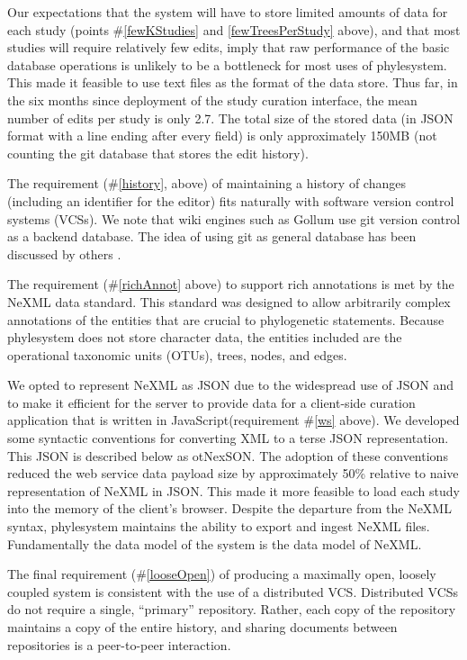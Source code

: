 \documentclass{bioinfo}
\newcommand{\ps}{phylesystem\xspace}
\newcommand{\nexson}{otNexSON\xspace}
\newcommand{\js}{JavaScript\xspace}
\begin{document}
Our expectations that the system will have to store limited amounts of data for each study 
    (points \#\ref{fewKStudies} and \ref{fewTreesPerStudy} above), and that most
    studies will require relatively few edits, imply that
    raw performance of the basic database operations is unlikely to be a bottleneck for most
    uses of \ps.
This made it feasible to use text files as the format of the data store.
Thus far, in the six months since deployment of the study curation interface, the mean number of edits 
    per study is only 2.7.
The total size of the stored data (in JSON format with a line ending after 
    every field) is only approximately 150MB (not counting the git database that stores the edit history).

The requirement (\#\ref{history}, above) of maintaining a history of changes 
    (including an identifier for the editor) fits naturally with software version control systems (VCSs).
We note that wiki engines such as Gollum use git version control as a backend database.
The idea of using git as general database has been discussed by others \citep{git-nosql-db}.

The requirement (\#\ref{richAnnot} above) to support rich annotations
    is met by the NeXML data standard.
    This standard was designed
    to allow arbitrarily complex annotations of the entities that are crucial to phylogenetic statements.
Because \ps does not store character data, the entities included are the operational taxonomic units (OTUs), trees, nodes, and edges.

We opted to represent NeXML as JSON
    due to the widespread use of JSON and 
    to make it efficient for the server to provide data for a client-side
    curation application that is written in \js (requirement \#\ref{ws} above).
We developed some syntactic conventions for converting XML to a terse JSON representation.
This JSON is described below as \nexson.
The adoption of these conventions reduced the web service data payload size by approximately 50\% relative to 
    naive representation of NeXML in JSON.
This made it more feasible to load each study into the memory of the client's browser.
Despite the departure from the NeXML syntax, \ps maintains the ability to export and ingest NeXML files.
Fundamentally the data model of the system is the data model of NeXML.

The final requirement (\#\ref{looseOpen}) of producing a maximally open,
    loosely coupled system is consistent with the use of a distributed
    VCS.
Distributed VCSs do not require a single, ``primary'' repository.
Rather, each copy of the repository maintains a copy of the entire history, and sharing documents between
    repositories is a peer-to-peer interaction.
\end{document}
